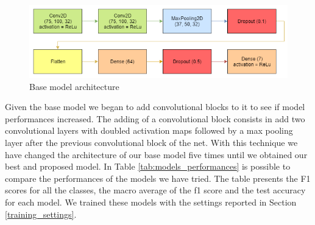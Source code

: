 		\begin{figure}[H]
			\centering
			\includegraphics[width=15cm]{images/base_model.png}
			\caption{Base model architecture}
			\label{fig:base_model}
		\end{figure}
	
		Given the base model we began to add convolutional blocks to it to see if model performances increased. The adding of a convolutional block consists in add two convolutional layers with doubled activation maps followed by a max pooling layer after the previous convolutional block of the net. With this technique we have changed the architecture of our base model five times until we obtained our best and proposed model. In Table \ref{tab:models_performances} is possible to compare the performances of the models we have tried. The table presents the F1 scores for all the classes, the macro average of the f1 score and the test accuracy for each model. We trained these models with the settings reported in Section \ref{training_settings}.
		
